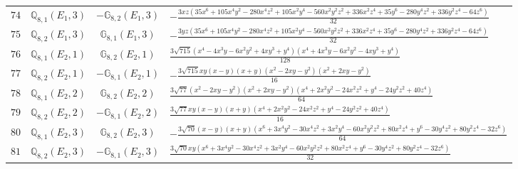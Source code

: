 \documentclass[fleqn,8pt,landscape]{jsarticle}
\begin{document}
\begin{table}[ht!]
\begin{center}
\begin{tabular}{cccl}
$ 74 $ & $ \mathbb{Q}_{8,1}(E_{1},3) $ & $ -\mathbb{G}_{8,2}(E_{1},3) $ & $ - \frac{3 x z \left(35 x^{6} + 105 x^{4} y^{2} - 280 x^{4} z^{2} + 105 x^{2} y^{4} - 560 x^{2} y^{2} z^{2} + 336 x^{2} z^{4} + 35 y^{6} - 280 y^{4} z^{2} + 336 y^{2} z^{4} - 64 z^{6}\right)}{32} $ \\
$ 75 $ & $ \mathbb{Q}_{8,2}(E_{1},3) $ & $ \mathbb{G}_{8,1}(E_{1},3) $ & $ - \frac{3 y z \left(35 x^{6} + 105 x^{4} y^{2} - 280 x^{4} z^{2} + 105 x^{2} y^{4} - 560 x^{2} y^{2} z^{2} + 336 x^{2} z^{4} + 35 y^{6} - 280 y^{4} z^{2} + 336 y^{2} z^{4} - 64 z^{6}\right)}{32} $ \\
$ 76 $ & $ \mathbb{Q}_{8,1}(E_{2},1) $ & $ \mathbb{G}_{8,2}(E_{2},1) $ & $ \frac{3 \sqrt{715} \left(x^{4} - 4 x^{3} y - 6 x^{2} y^{2} + 4 x y^{3} + y^{4}\right) \left(x^{4} + 4 x^{3} y - 6 x^{2} y^{2} - 4 x y^{3} + y^{4}\right)}{128} $ \\
$ 77 $ & $ \mathbb{Q}_{8,2}(E_{2},1) $ & $ -\mathbb{G}_{8,1}(E_{2},1) $ & $ - \frac{3 \sqrt{715} x y \left(x - y\right) \left(x + y\right) \left(x^{2} - 2 x y - y^{2}\right) \left(x^{2} + 2 x y - y^{2}\right)}{16} $ \\
$ 78 $ & $ \mathbb{Q}_{8,1}(E_{2},2) $ & $ \mathbb{G}_{8,2}(E_{2},2) $ & $ \frac{3 \sqrt{77} \left(x^{2} - 2 x y - y^{2}\right) \left(x^{2} + 2 x y - y^{2}\right) \left(x^{4} + 2 x^{2} y^{2} - 24 x^{2} z^{2} + y^{4} - 24 y^{2} z^{2} + 40 z^{4}\right)}{64} $ \\
$ 79 $ & $ \mathbb{Q}_{8,2}(E_{2},2) $ & $ -\mathbb{G}_{8,1}(E_{2},2) $ & $ \frac{3 \sqrt{77} x y \left(x - y\right) \left(x + y\right) \left(x^{4} + 2 x^{2} y^{2} - 24 x^{2} z^{2} + y^{4} - 24 y^{2} z^{2} + 40 z^{4}\right)}{16} $ \\
$ 80 $ & $ \mathbb{Q}_{8,1}(E_{2},3) $ & $ \mathbb{G}_{8,2}(E_{2},3) $ & $ - \frac{3 \sqrt{70} \left(x - y\right) \left(x + y\right) \left(x^{6} + 3 x^{4} y^{2} - 30 x^{4} z^{2} + 3 x^{2} y^{4} - 60 x^{2} y^{2} z^{2} + 80 x^{2} z^{4} + y^{6} - 30 y^{4} z^{2} + 80 y^{2} z^{4} - 32 z^{6}\right)}{64} $ \\
$ 81 $ & $ \mathbb{Q}_{8,2}(E_{2},3) $ & $ -\mathbb{G}_{8,1}(E_{2},3) $ & $ \frac{3 \sqrt{70} x y \left(x^{6} + 3 x^{4} y^{2} - 30 x^{4} z^{2} + 3 x^{2} y^{4} - 60 x^{2} y^{2} z^{2} + 80 x^{2} z^{4} + y^{6} - 30 y^{4} z^{2} + 80 y^{2} z^{4} - 32 z^{6}\right)}{32} $ \\
 \hline \hline
\end{tabular}
\end{center}
\end{table}
\end{document}
